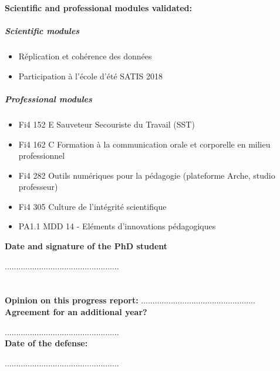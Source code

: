 \documentclass[12pt]{article}
\newcommand{\commentaire}[1]{}
\begin{document}
\noindent\textbf{Scientific and professional modules validated:}
\commentaire{%
  list of all modules validated from the beginning of the thesis (do
  not forget to add them in Adum, together with your publications)}
\subparagraph{Scientific modules}
  \begin{itemize}
      \item Réplication et cohérence des données
      \item Participation à l'école d'été SATIS 2018
  \end{itemize}
\subparagraph{Professional modules}
  \begin{itemize}
      \item Fi4 152 E Sauveteur Secouriste du Travail (SST)
      \item Fi4 162 C Formation à la communication orale et corporelle en milieu professionnel
      \item Fi4 282 Outils numériques pour la pédagogie (plateforme Arche, studio professeur)
      \item Fi4 305 Culture de l’intégrité scientifique
      \item PA1.1 MDD 14 - Eléments d’innovations pédagogiques
  \end{itemize}

\noindent\textbf{Date and signature of the PhD student}

..................................................


\newpage
\section*{}

\noindent\textbf{Opinion on this progress report:}
..................................................
\\

\noindent\textbf{Agreement for an additional year?}
\commentaire{%
  Yes/No (if No, please justify)\\}
..................................................
\\

\noindent\textbf{Date of the defense:}
\commentaire{%
  this can be an approximation\\}
..................................................
\\
\end{document}
